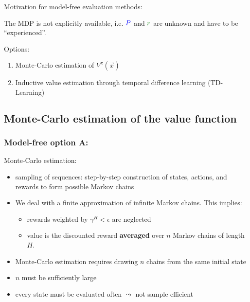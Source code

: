 \begin{frame}\frametitle{\secname}

Motivation for model-free evaluation methods:\\

\svspace{5mm}

The MDP is not explicitly available, i.e. ${\color{trans}P}$ and ${\color{reward}r}$ are unknown and have to be ``experienced''.\\

\svspace{5mm}

Options:
\begin{enumerate}[A]
\item Monte-Carlo estimation of $V^\pi(\vec x)$
\item Inductive value estimation through temporal difference learning (TD-Learning)
\end{enumerate}

\end{frame}

\subsection{Monte-Carlo estimation of the value function}

\begin{frame}\frametitle{Model-free option A:~\subsecname}

Monte-Carlo estimation:

	\begin{itemize}
		\item sampling of sequences: step-by-step construction of states, actions, and rewards to form possible Markov chains
		\item We deal with a finite approximation of infinite Markov chains. This implies:
			\begin{itemize}
				\item rewards weighted by $\gamma^H < \epsilon$ are neglected
				\item value is the discounted reward \textbf{averaged} over $n$ Markov chains of length $H$. 
			\end{itemize}
		
		
		\pause 
		
		\item Monte-Carlo estimation requires drawing $n$ chains 
			from the same initial state %
		\item $n$ must be sufficiently large
		\item every state must be evaluated often 
			$\leadsto$ not sample efficient
	\end{itemize}
	
\end{frame}

